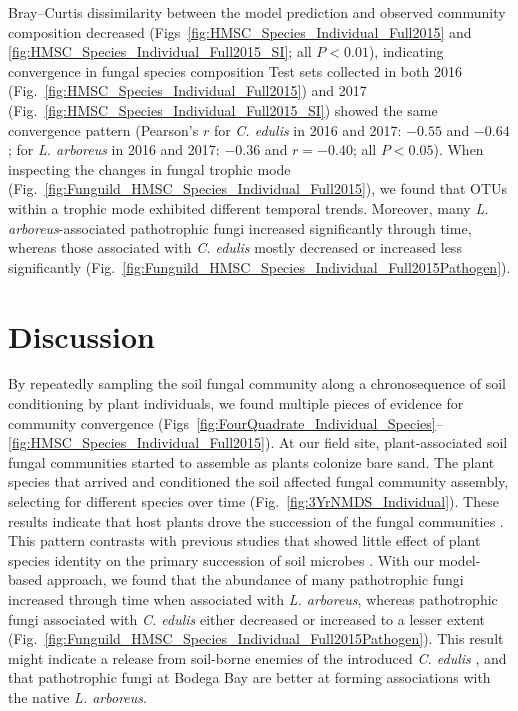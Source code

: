 Bray--Curtis dissimilarity between the model prediction and observed community composition decreased (Figs~\ref{fig:HMSC_Species_Individual_Full2015} and \ref{fig:HMSC_Species_Individual_Full2015_SI}; all $P<0.01$), indicating convergence in fungal species composition
Test sets collected in both 2016 (Fig.~\ref{fig:HMSC_Species_Individual_Full2015}) and 2017 (Fig.~\ref{fig:HMSC_Species_Individual_Full2015_SI}) showed the same convergence pattern (Pearson's $r$ for \textit{C. edulis} in 2016 and 2017: $-0.55$ and $-0.64$; for \textit{L. arboreus} in 2016 and 2017: $-0.36$ and $r=-0.40$; all $P < 0.05$). 
When inspecting the changes in fungal trophic mode (Fig.~\ref{fig:Funguild_HMSC_Species_Individual_Full2015}), we found that OTUs within a trophic mode exhibited different temporal trends. Moreover, many \textit{L. arboreus}-associated pathotrophic fungi increased significantly through time, whereas those associated with \textit{C. edulis} mostly decreased or increased less significantly (Fig.~\ref{fig:Funguild_HMSC_Species_Individual_Full2015Pathogen}).
\par



\section{Discussion}
By repeatedly sampling the soil fungal community along a chronosequence of soil conditioning by plant individuals, we found multiple pieces of evidence for community convergence (Figs~\ref{fig:FourQuadrate_Individual_Species}--\ref{fig:HMSC_Species_Individual_Full2015}).
At our field site, plant-associated soil fungal communities started to assemble as plants colonize bare sand. 
The plant species that arrived and conditioned the soil affected fungal community assembly, selecting for different species over time (Fig.~\ref{fig:3YrNMDS_Individual}). 
These results indicate that host plants drove the succession of the fungal communities \citep{RoyBolduc2016, Scheublin2004}. This pattern contrasts with previous studies that showed little effect of plant species identity on the primary succession of soil microbes \citep{BrownJumpponen2014, Sikes2014}.
With our model-based approach, we found that the abundance of many pathotrophic fungi increased through time when associated with \textit{L. arboreus}, whereas pathotrophic fungi associated with \textit{C. edulis} either decreased or increased to a lesser extent (Fig.~\ref{fig:Funguild_HMSC_Species_Individual_Full2015Pathogen}).
This result might indicate a release from soil-borne enemies of the introduced \textit{C. edulis} \citep{Keane2002, Callaway2004}, and that pathotrophic fungi at Bodega Bay are better at forming associations with the native \textit{L. arboreus}.
\par


